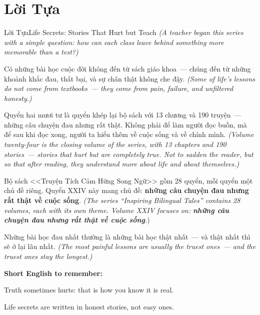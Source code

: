 \chapter*{Lời Tựa}

\begin{truyen}{Lời Tựa}{Life Secrets: Stories That Hurt but Teach}
\textit{(A teacher began this series with a simple question: how can each class leave behind something more memorable than a test?)}

Có những bài học cuộc đời không đến từ sách giáo khoa~--- chúng đến từ những khoảnh khắc đau, thất bại, và sự chân thật không che đậy.
\textit{(Some of life's lessons do not come from textbooks~--- they come from pain, failure, and unfiltered honesty.)}

Quyển hai mươi tư là quyển khép lại bộ sách với 13 chương và 190 truyện~--- những câu chuyện đau nhưng rất thật. Không phải để làm người đọc buồn, mà để sau khi đọc xong, người ta hiểu thêm về cuộc sống và về chính mình.
\textit{(Volume twenty-four is the closing volume of the series, with 13 chapters and 190 stories~--- stories that hurt but are completely true. Not to sadden the reader, but so that after reading, they understand more about life and about themselves.)}

Bộ sách <<Truyện Tích Cảm Hứng Song Ngữ>> gồm 28 quyển, mỗi quyển một chủ đề riêng. Quyển XXIV này mang chủ đề: \textbf{những câu chuyện đau nhưng rất thật về cuộc sống}.
\textit{(The series ``Inspiring Bilingual Tales'' contains 28 volumes, each with its own theme. Volume XXIV focuses on: \textbf{những câu chuyện đau nhưng rất thật về cuộc sống}.})
\end{truyen}

\begin{baihoc}
Những bài học đau nhất thường là những bài học thật nhất~--- và thật nhất thì sẽ ở lại lâu nhất.
\textit{(The most painful lessons are usually the truest ones~--- and the truest ones stay the longest.)}
\end{baihoc}

\begin{ghinhoanh}
\textbf{Short English to remember:}

Truth sometimes hurts: that is how you know it is real.

Life secrets are written in honest stories, not easy ones.
\end{ghinhoanh}

